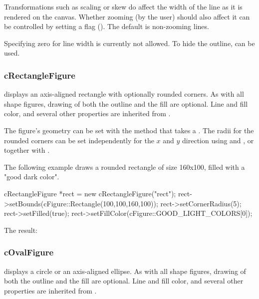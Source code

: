 Transformations such as scaling or skew do affect the width of the line as it
is rendered on the canvas. Whether zooming (by the user) should also affect
it can be controlled by setting a flag ().
The default is non-zooming lines.

Specifying zero for line width is currently not allowed. To hide the outline,
 can be used.


\subsubsection{cRectangleFigure}
\label{sec:graphics:rectanglefigure}

 displays an axis-aligned rectangle with
optionally rounded corners. As with all shape figures, drawing of both the
outline and the fill are optional. Line and fill color, and several other
properties are inherited from .

The figure's geometry can be set with the  method that
takes a . The radii for the rounded corners can
be set independently for the $x$ and $y$ direction using
 and , or together with
.

The following example draws a rounded rectangle of size 160x100, filled with
a "good dark color".

\begin{cpp}
cRectangleFigure *rect = new cRectangleFigure("rect");
rect->setBounds(cFigure::Rectangle(100,100,160,100));
rect->setCornerRadius(5);
rect->setFilled(true);
rect->setFillColor(cFigure::GOOD_LIGHT_COLORS[0]);
\end{cpp}


The result:

\begin{center}

\end{center}


\subsubsection{cOvalFigure}
\label{sec:graphics:ovalfigure}

 displays a circle or an axis-aligned ellipse. As with
all shape figures, drawing of both the outline and the fill are optional.
Line and fill color, and several other properties are inherited from
.

